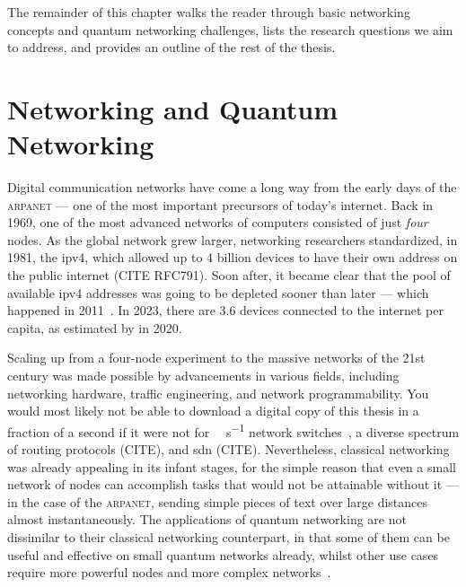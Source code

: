 \begin{refsection}
The remainder of this chapter walks the reader through basic networking concepts and quantum
networking challenges, lists the research questions we aim to address, and provides an outline of
the rest of the thesis.

\section{Networking and Quantum Networking}


Digital communication networks have come a long way from the early days of the \textsc{arpanet} ---
one of the most important precursors of today's internet. Back in 1969, one of the most advanced
networks of computers consisted of just \emph{four} nodes. As the global network grew larger,
networking researchers standardized, in 1981, the \acrfull{ipv4}, which allowed up to \num{4}
billion devices to have their own address on the public internet (CITE RFC791). Soon after, it
became clear that the pool of available \acrshort{ipv4} addresses was going to be depleted sooner
than later --- which happened in 2011~\cite{icann_2011}. In 2023, there are \num{3.6} devices
connected to the internet per capita, as estimated by \textcite{cisco_2020} in 2020.

Scaling up from a four-node experiment to the massive networks of the 21st century was made possible
by advancements in various fields, including networking hardware, traffic engineering, and network
programmability. You would most likely not be able to download a digital copy of this thesis in a
fraction of a second if it were not for \unit{\tera\bit\per\second} network
switches~\cite{broadcom_tomahawk, juniper_qfx5220}, a diverse spectrum of routing protocols (CITE),
and \acrlong{sdn} (CITE). Nevertheless, classical networking was already appealing in its infant
stages, for the simple reason that even a small network of nodes can accomplish tasks that would not
be attainable without it --- in the case of the \textsc{arpanet}, sending simple pieces of text over
large distances almost instantaneously. The applications of quantum networking are not dissimilar to
their classical networking counterpart, in that some of them can be useful and effective on small
quantum networks already, whilst other use cases require more powerful nodes and more complex
networks~\cite{wehner_stages_2018}.


\end{refsection}

